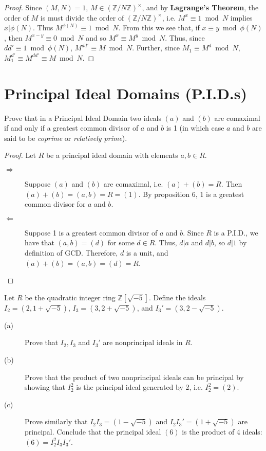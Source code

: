 \documentclass[12pt,leqno]{book}
\numberwithin{equation}{section}
\newcommand{\question}[2] {\vspace{.25in}\noindent\fbox{#1} #2 \vspace{.10in}}
\theoremstyle{definition}
\begin{document}
\begin{proof}
 Since $(M,N)=1$, $M\in(\mathbb{Z}/N\mathbb{Z})^{\times}$, and by \textbf{Lagrange's Theorem}, the order of $M$ is must divide the order of $(\mathbb{Z}/N\mathbb{Z})^{\times}$, i.e. $M^x\equiv1\bmod{N}$ implies $x|\phi(N)$. Thus $M^{\phi(N)}\equiv1\bmod{N}$. From this we see that, if $x\equiv y\bmod{\phi(N)}$, then $M^{x-y}\equiv0\bmod{N}$ and so $M^x\equiv M^y\bmod{N}$. Thus, since $dd'\equiv1\bmod{\phi(N)}$, $M^{dd'}\equiv M\bmod{N}$. Further, since $M_1\equiv M^d\bmod{N}$, $M_1^{d'}\equiv M^{dd'}\equiv M\bmod{N}$.
\end{proof}


\section{Principal Ideal Domains (P.I.D.s)}

\question{1}{Prove that in a Principal Ideal Domain two ideals $(a)$ and $(b)$ are comaximal if and only if a greatest common divisor of $a$ and $b$ is 1 (in which case $a$ and $b$ are said to be \textit{coprime} or \textit{relatively prime}).}

\begin{proof}Let $R$ be a principal ideal domain with elements $a,b\in R$.
\begin{description}
 \item [$\Rightarrow$] Suppose $(a)$ and $(b)$ are comaximal, i.e. $(a)+(b)=R$. Then $(a)+(b)=(a,b)=R=(1)$. By proposition 6, $1$ is a greatest common divisor for $a$ and $b$. 
 \item [$\Leftarrow$] Suppose 1 is a greatest common divisor of $a$ and $b$. Since $R$ is a P.I.D., we have that $(a,b)=(d)$ for some $d\in R$. Thus, $d|a$ and $d|b$, so $d|1$ by definition of GCD. Therefore, $d$ is a unit, and $(a)+(b)=(a,b)=(d)=R$.\qedhere 
\end{description}
\end{proof}

\question{5}{Let $R$ be the quadratic integer ring $\mathbb{Z}[\sqrt{-5}]$. Define the ideals $I_2=(2,1+\sqrt{-5})$, $I_3=(3,2+\sqrt{-5})$, and $I_3'=(3,2-\sqrt{-5})$.}
\begin{description}
 \item [(a)] Prove that $I_2,I_3$ and $I_3'$ are nonprincipal ideals in $R$.
 \item [(b)] Prove that the product of two nonprincipal ideals can be principal by showing that $I_2^2$ is the principal ideal generated by 2, i.e. $I_2^2=(2)$.
 \item [(c)] Prove similarly that $I_2I_3=(1-\sqrt{-5})$ and $I_2I_3'=(1+\sqrt{-5})$ are principal. Conclude that the principal ideal $(6)$ is the product of 4 ideals: $(6)=I_2^2I_3I_3'$.
\end{description}
\end{document}
